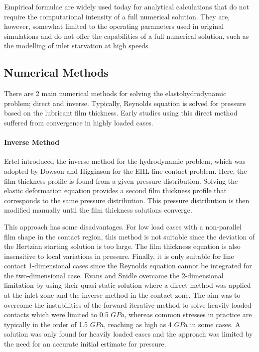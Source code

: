 Empirical formulae are widely used today for analytical calculations that do not require the computational intensity of a full numerical solution. They are, however, somewhat limited to the operating parameters used in original simulations and do not offer the capabilities of a full numerical solution, such as the modelling of inlet starvation at high speeds.

\subsection{Numerical Methods}

There are 2 main numerical methods for solving the elastohydrodynamic problem; direct and inverse. Typically, Reynolds equation is solved for pressure based on the lubricant film thickness. Early studies using this direct method suffered from convergence in highly loaded cases.

\paragraph{Inverse Method}

Ertel \cite{Ertel1939} introduced the inverse method for the hydrodynamic problem, which was adopted by Dowson and Higginson \cite{Dowson1959} for the EHL line contact problem. Here, the film thickness profile is found from a given pressure distribution. Solving the elastic deformation equation provides a second film thickness profile that corresponds to the same pressure distribution. This pressure distribution is then modified manually until the film thickness solutions converge.

This approach has some disadvantages. For low load cases with a non-parallel film shape in the contact region, this method is not suitable since the deviation of the Hertzian starting solution is too large. The film thickness equation is also insensitive to local variations in pressure. Finally, it is only suitable for line contact 1-dimensional cases since the Reynolds equation cannot be integrated for the two-dimensional case. Evans and Snidle \cite{Evans1982} overcame the 2-dimensional limitation by using their quasi-static solution where a direct method was applied at the inlet zone and the inverse method in the contact zone. The aim was to overcome the instabilities of the forward iterative method to solve heavily loaded contacts which were limited to 0.5 $GPa$, whereas common stresses in practice are typically in the order of 1.5 $GPa$, reaching as high as 4 $GPa$ in some cases. A solution was only found for heavily loaded cases and the approach was limited by the need for an accurate initial estimate for pressure.

